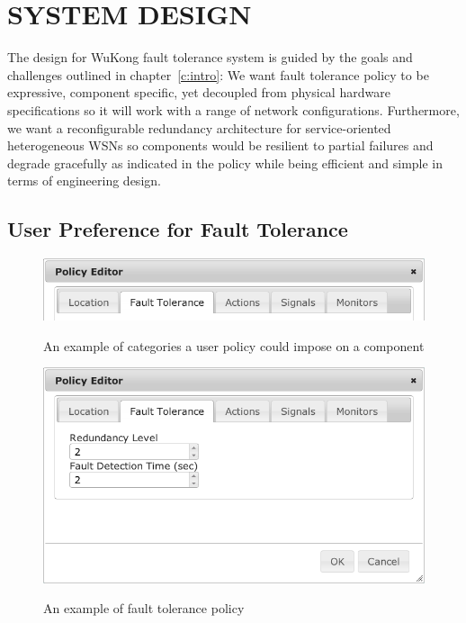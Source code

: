 \cleardoublepage
\singlespacing
\chapter{SYSTEM DESIGN}
\label{c:design}
\doublespacing\nointerlineskip

The design for WuKong fault tolerance system is guided by the goals and
challenges outlined in chapter~\ref{c:intro}: We want fault tolerance
policy to be expressive, component specific, yet decoupled from physical
hardware specifications so it will work with a range of network configurations.
Furthermore, we want a reconfigurable redundancy architecture for
service-oriented heterogeneous WSNs so components would be resilient to partial
failures and degrade gracefully as indicated in the policy while being efficient
and simple in terms of engineering design.

\section{User Preference for Fault Tolerance}

\begin{figure}[h!]
\caption{An example of categories a user policy could impose on a component}
\centering
    \includegraphics[width=\linewidth]{figures/fbp-policy}
\label{fig:fbp-policy}
\end{figure}

\begin{figure}[h!]
\caption{An example of fault tolerance policy}
\centering
    \includegraphics[width=\linewidth]{figures/fbp-ft-policy}
\label{fig:fbp-ft-policy}
\end{figure}


